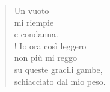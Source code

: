 
\begin{verse}
    Un vuoto\\
    mi riempie\\
    e condanna.\\!
    Io ora così leggero\\
    non più mi reggo\\
    su queste gracili gambe,\\
    schiacciato dal mio peso.
\end{verse}